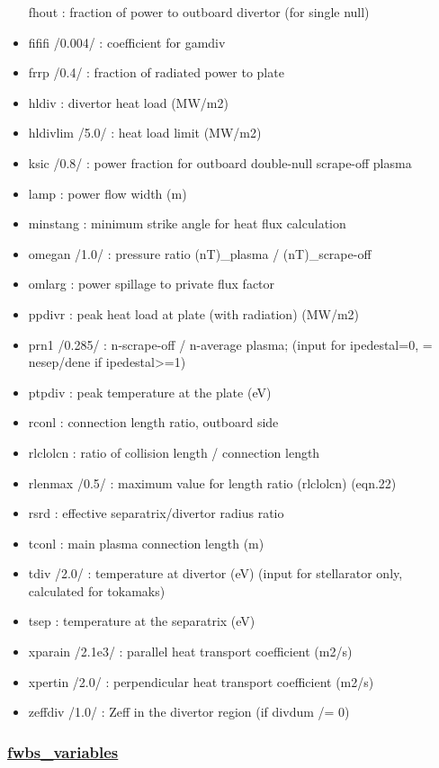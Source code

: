 \documentclass[]{article}
\begin{document}
\begin{itemize}
  fhout : fraction of power to outboard divertor (for single null)
\item
  fififi /0.004/ : coefficient for gamdiv
\item
  frrp /0.4/ : fraction of radiated power to plate
\item
  hldiv : divertor heat load (MW/m2)
\item
  hldivlim /5.0/ : heat load limit (MW/m2)
\item
  ksic /0.8/ : power fraction for outboard double-null scrape-off plasma
\item
  lamp : power flow width (m)
\item
  minstang : minimum strike angle for heat flux calculation
\item
  omegan /1.0/ : pressure ratio (nT)\_plasma / (nT)\_scrape-off
\item
  omlarg : power spillage to private flux factor
\item
  ppdivr : peak heat load at plate (with radiation) (MW/m2)
\item
  prn1 /0.285/ : n-scrape-off / n-average plasma; (input for
  ipedestal=0, = nesep/dene if ipedestal\textgreater{}=1)
\item
  ptpdiv : peak temperature at the plate (eV)
\item
  rconl : connection length ratio, outboard side
\item
  rlclolcn : ratio of collision length / connection length
\item
  rlenmax /0.5/ : maximum value for length ratio (rlclolcn) (eqn.22)
\item
  rsrd : effective separatrix/divertor radius ratio
\item
  tconl : main plasma connection length (m)
\item
  tdiv /2.0/ : temperature at divertor (eV) (input for stellarator only,
  calculated for tokamaks)
\item
  tsep : temperature at the separatrix (eV)
\item
  xparain /2.1e3/ : parallel heat transport coefficient (m2/s)
\item
  xpertin /2.0/ : perpendicular heat transport coefficient (m2/s)
\item
  zeffdiv /1.0/ : Zeff in the divertor region (if divdum /= 0)
\end{itemize}

\subsubsection{\texorpdfstring{\href{fwbs_variables.html}{fwbs\_variables}}{fwbs\_variables}}\label{fwbs_variables}
\end{document}
